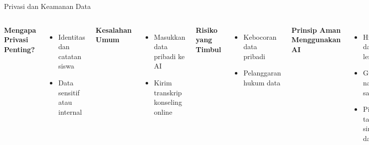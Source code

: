 \documentclass[aspectratio=169, table]{beamer}
\begin{document}
	\begin{frame}[fragile]{Privasi dan Keamanan Data}
		\vspace{15pt}
		\begin{columns}[T]
			\textbf{Mengapa Privasi Penting?}
			\begin{itemize}
				\item Identitas dan catatan siswa
				\item Data sensitif atau internal
			\end{itemize}
			
			\textbf{Kesalahan Umum}
			\begin{itemize}
				\item Masukkan data pribadi ke AI
				\item Kirim transkrip konseling online
			\end{itemize}
			
			\textbf{Risiko yang Timbul}
			\begin{itemize}
				\item Kebocoran data pribadi
				\item Pelanggaran hukum data
			\end{itemize}
			
			\textbf{Prinsip Aman Menggunakan AI}
			\begin{itemize}
				\item Hindari data lengkap
				\item Gunakan nama samaran
				\item Pilih AI tanpa simpan data
			\end{itemize}
			
			\textbf{Peran Sekolah dan Guru}
			\begin{itemize}
				\item Latih etika digital
				\item Buat kebijakan AI
			\end{itemize}
			
			\textbf{Kesimpulan}
			\begin{itemize}
				\item AI bantu, bukan simpan data
				\item Privasi tanggung jawab bersama
			\end{itemize}
		\end{columns}
	\end{frame}
	
\end{document}
